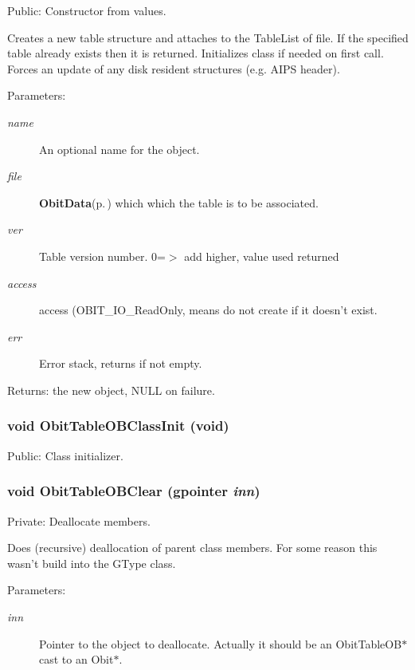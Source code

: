 Public: Constructor from values. 

Creates a new table structure and attaches to the Table\-List of file. If the specified table already exists then it is returned. Initializes class if needed on first call. Forces an update of any disk resident structures (e.g. AIPS header). \begin{Desc}
\item[Parameters:]
\begin{description}
\item[{\em name}]An optional name for the object. \item[{\em file}]{\bf Obit\-Data}{\rm (p.\,\pageref{structObitData})} which which the table is to be associated. \item[{\em ver}]Table version number. 0=$>$ add higher, value used returned \item[{\em access}]access (OBIT\_\-IO\_\-Read\-Only, means do not create if it doesn't exist. \item[{\em err}]Error stack, returns if not empty. \end{description}
\end{Desc}
\begin{Desc}
\item[Returns:]the new object, NULL on failure. \end{Desc}
\subsubsection{\setlength{\rightskip}{0pt plus 5cm}void Obit\-Table\-OBClass\-Init (void)}\label{ObitTableOB_8c_a27}


Public: Class initializer. 

\subsubsection{\setlength{\rightskip}{0pt plus 5cm}void Obit\-Table\-OBClear (gpointer {\em inn})}\label{ObitTableOB_8c_a9}


Private: Deallocate members. 

Does (recursive) deallocation of parent class members. For some reason this wasn't build into the GType class. \begin{Desc}
\item[Parameters:]
\begin{description}
\item[{\em inn}]Pointer to the object to deallocate. Actually it should be an Obit\-Table\-OB$\ast$ cast to an Obit$\ast$. \end{description}
\end{Desc}

